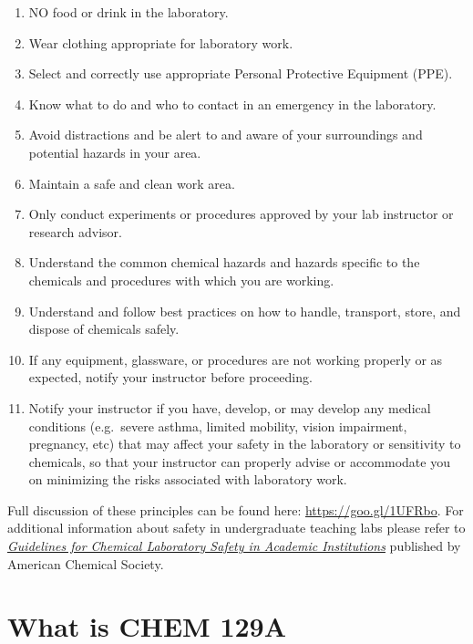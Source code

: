 \begin{enumerate}
\def\labelenumi{\arabic{enumi}.}
\tightlist
\item
  NO food or drink in the laboratory.
\item
  Wear clothing appropriate for laboratory work.
\item
  Select and correctly use appropriate Personal Protective Equipment
  (PPE).
\item
  Know what to do and who to contact in an emergency in the laboratory.
\item
  Avoid distractions and be alert to and aware of your surroundings and
  potential hazards in your area.
\item
  Maintain a safe and clean work area.
\item
  Only conduct experiments or procedures approved by your lab instructor
  or research advisor.
\item
  Understand the common chemical hazards and hazards specific to the
  chemicals and procedures with which you are working.\\
\item
  Understand and follow best practices on how to handle, transport,
  store, and dispose of chemicals safely.
\item
  If any equipment, glassware, or procedures are not working properly or
  as expected, notify your instructor before proceeding.
\item
  Notify your instructor if you have, develop, or may develop any
  medical conditions (e.g.~severe asthma, limited mobility, vision
  impairment, pregnancy, etc) that may affect your safety in the
  laboratory or sensitivity to chemicals, so that your instructor can
  properly advise or accommodate you on minimizing the risks associated
  with laboratory work.
\end{enumerate}

Full discussion of these principles can be found here:
\url{https://goo.gl/1UFRbo}. For additional information about safety in
undergraduate teaching labs please refer to
\href{https://www.acs.org/content/dam/acsorg/about/governance/committees/chemicalsafety/publications/acs-safety-guidelines-academic.pdf}{\emph{Guidelines
for Chemical Laboratory Safety in Academic Institutions}} published by
American Chemical Society.

\hypertarget{what-is-chem-129a}{%
\section{What is CHEM 129A}\label{what-is-chem-129a}}

